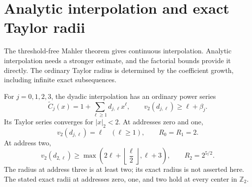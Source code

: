 \section{Analytic interpolation and exact Taylor radii}
\label{sec:analytic-radii-final}

The threshold-free Mahler theorem gives continuous interpolation.
Analytic interpolation needs a stronger estimate, and the factorial
bounds provide it directly. The ordinary Taylor radius is determined
by the coefficient growth, including infinite exact subsequences.

\begin{theorem}
\label{thm:four-taylor-radii}
For $j=0,1,2,3$, the dyadic interpolation has an ordinary power series
\[
 \widetilde C_j(x)=1+\sum_{\ell\geq1}d_{j,\ell}x^\ell,
 \qquad v_2(d_{j,\ell})\geq\ell+\beta_j.
\]
Its Taylor series converges for $|x|_2<2$.
At addresses zero and one,
\begin{equation}
 v_2(d_{j,\ell})=\ell\quad(\ell\geq1),
 \qquad R_0=R_1=2.
 \label{eq:zero-one-exact-taylor-radius}
\end{equation}
At address two,
\begin{equation}
 v_2(d_{2,\ell})\geq
       \max\left(2\ell+\left\lfloor\frac\ell2\right\rfloor,
                          \ell+3\right),
 \qquad R_2=2^{5/2}.
 \label{eq:two-exact-taylor-radius}
\end{equation}
The radius at address three is at least two; its exact radius is not
asserted here. The stated exact radii at addresses zero, one, and two
hold at every center in $\mathbb Z_2$.
\end{theorem}


